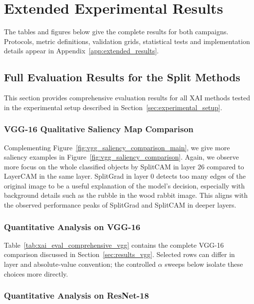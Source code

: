 \chapter{Extended Experimental Results}\label{app:supp_experiments}

The tables and figures below give the complete results for both campaigns. Protocols, metric definitions, validation grids, statistical tests and implementation details appear in Appendix~\ref{app:extended_results}.

\section{Full Evaluation Results for the Split Methods}\label{app:saliency}

This section provides comprehensive evaluation results for all XAI methods tested in the experimental setup described in Section~\ref{sec:experimental_setup}.

\subsection{VGG-16 Qualitative Saliency Map Comparison}\label{app:vgg_qualitative}
Complementing Figure~\ref{fig:vgg_saliency_comparison_main}, we give more saliency examples in Figure~\ref{fig:vgg_saliency_comparison}. Again, we observe more focus on the whole classified objects by SplitCAM in layer 26 compared to LayerCAM in the same layer. SplitGrad in layer 0 detects too many edges of the original image to be a useful explanation of the model's decision, especially with background details such as the rubble in the wood rabbit image. This aligns with the observed performance peaks of SplitGrad and SplitCAM in deeper layers.



\subsection{Quantitative Analysis on VGG-16}\label{app:vgg_split}

Table~\ref{tab:xai_eval_comprehensive_vgg} contains the complete VGG-16 comparison discussed in Section~\ref{sec:results_vgg}. Selected rows can differ in layer and absolute-value convention; the controlled $\alpha$ sweeps below isolate these choices more directly.



\subsection{Quantitative Analysis on ResNet-18}\label{app:resnet_split}

